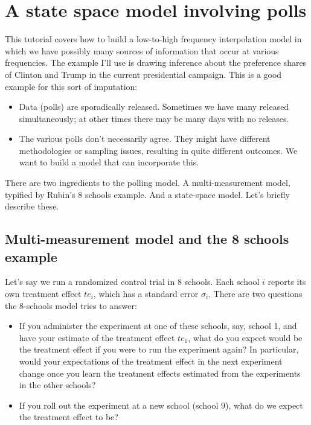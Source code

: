\documentclass[]{book}
\providecommand{\tightlist}{%
  \setlength{\itemsep}{0pt}\setlength{\parskip}{0pt}}
\begin{document}
\section{A state space model involving
polls}\label{a-state-space-model-involving-polls}

This tutorial covers how to build a low-to-high frequency interpolation
model in which we have possibly many sources of information that occur
at various frequencies. The example I'll use is drawing inference about
the preference shares of Clinton and Trump in the current presidential
campaign. This is a good example for this sort of imputation:

\begin{itemize}
\tightlist
\item
  Data (polls) are sporadically released. Sometimes we have many
  released simultaneously; at other times there may be many days with no
  releases.
\item
  The various polls don't necessarily agree. They might have different
  methodologies or sampling issues, resulting in quite different
  outcomes. We want to build a model that can incorporate this.
\end{itemize}

There are two ingredients to the polling model. A multi-measurement
model, typified by Rubin's 8 schools example. And a state-space model.
Let's briefly describe these.

\subsection{Multi-measurement model and the 8 schools
example}\label{multi-measurement-model-and-the-8-schools-example}

Let's say we run a randomized control trial in 8 schools. Each school
\(i\) reports its own treatment effect \(te_{i}\), which has a standard
error \(\sigma_{i}\). There are two questions the 8-schools model tries
to answer:

\begin{itemize}
\tightlist
\item
  If you administer the experiment at one of these schools, say, school
  1, and have your estimate of the treatment effect \(te_{1}\), what do
  you expect would be the treatment effect if you were to run the
  experiment again? In particular, would your expectations of the
  treatment effect in the next experiment change once you learn the
  treatment effects estimated from the experiments in the other schools?
\item
  If you roll out the experiment at a new school (school \(9\)), what do
  we expect the treatment effect to be?
\end{itemize}
\end{document}
